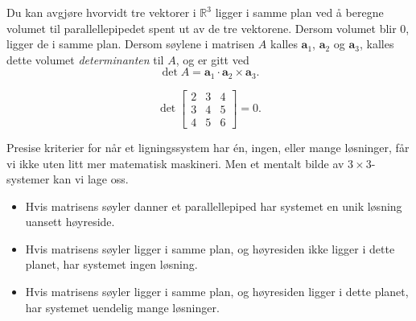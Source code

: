 \noindent Du kan avgjøre hvorvidt tre vektorer i $\mathbb{R}^3$ ligger i samme plan ved å beregne volumet til parallellepipedet spent ut av de tre vektorene. Dersom volumet blir 0, ligger de i samme plan. Dersom søylene i matrisen $A$ kalles $\mathbf{a}_1$, $\mathbf{a}_2$ og $\mathbf{a}_3$, kalles dette volumet \emph{determinanten} til $A$, og er gitt ved
\begin{equation*}
\det A= \mathbf{a}_1\cdot \mathbf{a}_2 \times \mathbf{a}_3.
\end{equation*}
\begin{ex}	 
	\begin{equation*}
	\det
	\begin{bmatrix}
	2  &  3  &  4   \\
	3  & 4  &  5 \\
	4  & 5  &  6 
	\end{bmatrix}
	=0.
	\end{equation*}
\end{ex}


\noindent Presise kriterier for når et ligningssystem har én, ingen, eller mange løsninger, får vi ikke uten litt mer matematisk maskineri. Men et mentalt bilde av $3\times 3$-systemer kan vi lage oss. 
\begin{itemize}
	\item Hvis matrisens søyler danner et parallellepiped har systemet en unik løsning uansett høyreside.
	\item Hvis matrisens søyler ligger i samme plan, og høyresiden ikke ligger i dette planet, har systemet ingen løsning.
	\item Hvis matrisens søyler ligger i samme plan, og høyresiden ligger i dette planet, har systemet uendelig mange løsninger.
\end{itemize}

